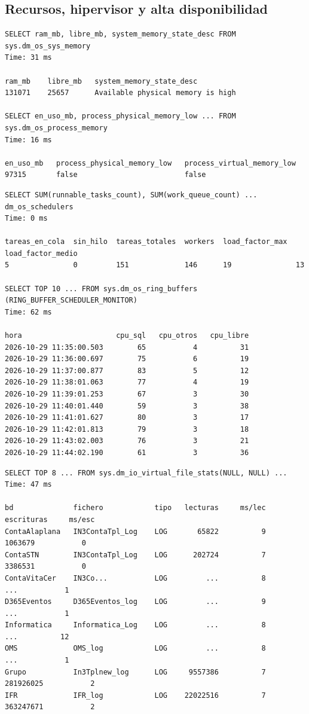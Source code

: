 \documentclass[11pt,a4paper]{article}
\begin{document}
\subsection{Recursos, hipervisor y alta disponibilidad}

\begin{lstlisting}[style=salida]
SELECT ram_mb, libre_mb, system_memory_state_desc FROM sys.dm_os_sys_memory
Time: 31 ms

ram_mb    libre_mb   system_memory_state_desc
131071    25657      Available physical memory is high

SELECT en_uso_mb, process_physical_memory_low ... FROM sys.dm_os_process_memory
Time: 16 ms

en_uso_mb   process_physical_memory_low   process_virtual_memory_low
97315       false                         false
\end{lstlisting}

\begin{lstlisting}[style=salida]
SELECT SUM(runnable_tasks_count), SUM(work_queue_count) ... dm_os_schedulers
Time: 0 ms

tareas_en_cola  sin_hilo  tareas_totales  workers  load_factor_max  load_factor_medio
5               0         151             146      19               13

SELECT TOP 10 ... FROM sys.dm_os_ring_buffers (RING_BUFFER_SCHEDULER_MONITOR)
Time: 62 ms

hora                      cpu_sql   cpu_otros   cpu_libre
2026-10-29 11:35:00.503        65           4          31
2026-10-29 11:36:00.697        75           6          19
2026-10-29 11:37:00.877        83           5          12
2026-10-29 11:38:01.063        77           4          19
2026-10-29 11:39:01.253        67           3          30
2026-10-29 11:40:01.440        59           3          38
2026-10-29 11:41:01.627        80           3          17
2026-10-29 11:42:01.813        79           3          18
2026-10-29 11:43:02.003        76           3          21
2026-10-29 11:44:02.190        61           3          36
\end{lstlisting}

\begin{lstlisting}[style=salida]
SELECT TOP 8 ... FROM sys.dm_io_virtual_file_stats(NULL, NULL) ...
Time: 47 ms

bd              fichero            tipo   lecturas     ms/lec   escrituras     ms/esc
ContaAlaplana   IN3ContaTpl_Log    LOG       65822          9      1063679           0
ContaSTN        IN3ContaTpl_Log    LOG      202724          7      3386531           0
ContaVitaCer    IN3Co...           LOG         ...          8          ...           1
D365Eventos     D365Eventos_log    LOG         ...          9          ...           1
Informatica     Informatica_Log    LOG         ...          8          ...          12
OMS             OMS_log            LOG         ...          8          ...           1
Grupo           In3Tplnew_log      LOG     9557386          7    281926025           2
IFR             IFR_log            LOG    22022516          7    363247671           2
\end{lstlisting}
\end{document}
